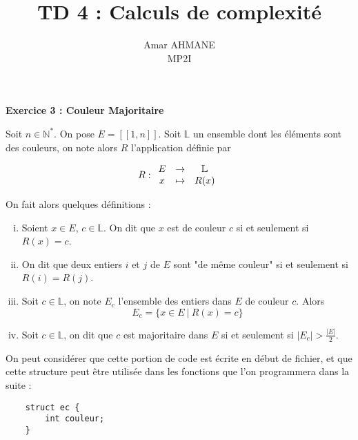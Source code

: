 \documentclass[10pt]{article}
\title{\textbf{TD 4 : Calculs de complexité}}
\author{Amar AHMANE \\ MP2I}
\date{}
\newcommand{\subsct}[1]{
	\begin{center}
		\large\textbf{#1}
	\end{center}
}
\def\N{\mathbb N}
\def\L{\mathbb L}
\begin{document}
	\maketitle
	\subsct{Exercice 3 : Couleur Majoritaire}
	Soit $n\in\N^*$. On pose $E=[\![1, n]\!]$. Soit $\L$ un ensemble dont les éléments sont des couleurs, on note alors $R$ l'application définie par 


	\[R:\begin{array}{c c c}E&\to& \L\\ x&\mapsto& R(x)\end{array}\]

	On fait alors quelques définitions :
	\begin{enumerate}[(i)]
		\item Soient $x\in E$, $c\in\L$. On dit que $x$ est de couleur $c$ si et seulement si $R(x)=c$.
		\item On dit que deux entiers $i$ et $j$ de $E$ sont "de même couleur" si et seulement si $R(i)=R(j)$. 
		\item Soit $c\in\L$, on note $E_c$ l'ensemble des entiers dans $E$ de couleur $c$. Alors \[E_c=\lbrace x\in E\ |\ R(x)=c\rbrace\]
		\item Soit $c\in\L$, on dit que $c$ est majoritaire dans $E$ si et seulement si $|E_c|>\frac{|E|}2$.
	\end{enumerate}

	On peut considérer que cette portion de code est écrite en début de fichier, et que cette structure peut être utilisée dans les fonctions que l'on programmera dans la suite :
	\begin{lstlisting}
	struct ec {
		int couleur;
	}
	\end{lstlisting}

	\vspace{2mm}
\end{document}
